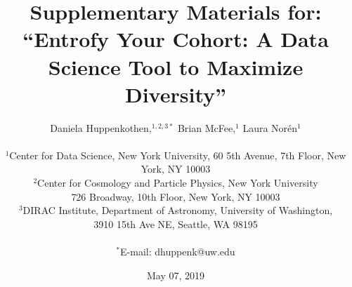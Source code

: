 \documentclass[12pt]{article}
\begin{document}

\title{Supplementary Materials for: ``Entrofy Your Cohort: A Data Science Tool to Maximize Diversity''} 




\author
{Daniela Huppenkothen,${}^{1,2,3\ast}$ Brian McFee,${}^{1}$ Laura Nor\'{e}n${}^{1}$\\
\\
\normalsize{${}^{1}$Center for Data Science, New York University, 60 5th Avenue, 7th Floor, New York, NY 10003}\\
\normalsize{${}^{2}$Center for Cosmology and Particle Physics, New York University}\\
\normalsize{726 Broadway, 10th Floor, New York, NY 10003}\\
\normalsize{${}^{3}$DIRAC Institute, Department of Astronomy, University of Washington,}\\
\normalsize{3910 15th Ave NE, Seattle, WA 98195}\\
\\
\normalsize{$^\ast$E-mail:  dhuppenk@uw.edu}
}




\date{May 07, 2019}%

\maketitle{}
\end{document}

